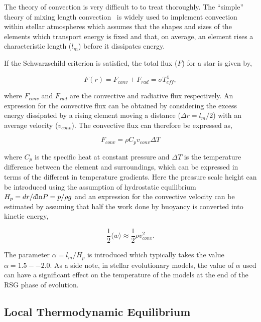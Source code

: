 The theory of convection is very difficult to to treat thoroughly.
The ``simple'' theory of mixing length convection~\cite{1958ZA.....46..108B,1965ApJ...142..841H} is widely used to implement convection within stellar atmospheres which assumes that the shapes and sizes of the elements which transport energy is fixed and that, on average, an element rises a characteristic length ($l_m$) before it dissipates energy.

If the Schwarzschild criterion is satisfied, the total flux ($F$) for a star is given by,

\begin{equation}
    F(r) = F_{conv} + F_{rad} = \sigma T_{eff}^4,\label{eq:flux}
\end{equation}

\noindent where $F_{conv}$ and $F_{rad}$ are the convective and radiative flux respectively.
An expression for the convective flux can be obtained by considering the excess energy dissipated by a rising element moving a distance
($\Delta r = l_m/2$) with an average velocity ($v_{conv}$).
The convective flux can therefore be expressed as,

\begin{equation}
    F_{conv} = \rho C_pv_{conv}\Delta T
\end{equation}

\noindent where $C_p$ is the specific heat at constant pressure and $\Delta T$ is the temperature difference between the element and surroundings, which can be expressed in terms of the different in temperature gradients.
Here the pressure scale height can be introduced using the assumption of hydrostatic equilibrium $H_p = dr / d{\rm ln} P = p/\rho g$ and an expression for the convective velocity can be estimated by assuming that half the work done by buoyancy is converted into kinetic energy,

\begin{equation}
    \frac{1}{2}\langle w\rangle \approx \frac{1}{2}\rho v_{conv}^2.
\end{equation}

The parameter $\alpha = l_m/H_p$ is introduced which typically takes the value $\alpha = 1.5--2.0$.
As a side note, in stellar evolutionary models, the value of $\alpha$ used can have a significant effect on the temperature of the models at the end of the RSG phase of evolution.



\subsection{Local Thermodynamic Equilibrium} %
\label{sub:local_thermodynamic_equilibrium}

